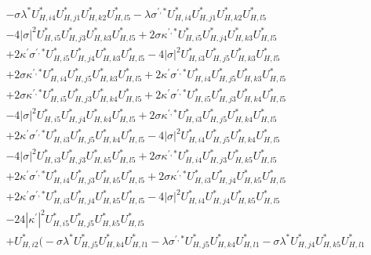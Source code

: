 \begin{align}
 &- \sigma \lambda^* U^*_{{H},{i 4}} U^*_{{H},{j 1}} U^*_{{H},{k 2}} U^*_{{H},{l 5}} - \lambda \sigma^{\prime,*} U^*_{{H},{i 4}} U^*_{{H},{j 1}} U^*_{{H},{k 2}} U^*_{{H},{l 5}} \nonumber \\ 
 &-4 |\sigma|^2 U^*_{{H},{i 5}} U^*_{{H},{j 3}} U^*_{{H},{k 3}} U^*_{{H},{l 5}} +2 \sigma \kappa^{\prime,*} U^*_{{H},{i 5}} U^*_{{H},{j 4}} U^*_{{H},{k 3}} U^*_{{H},{l 5}} \nonumber \\ 
 &+2 \kappa^\prime \sigma^{\prime,*} U^*_{{H},{i 5}} U^*_{{H},{j 4}} U^*_{{H},{k 3}} U^*_{{H},{l 5}} -4 |\sigma|^2 U^*_{{H},{i 3}} U^*_{{H},{j 5}} U^*_{{H},{k 3}} U^*_{{H},{l 5}} \nonumber \\ 
 &+2 \sigma \kappa^{\prime,*} U^*_{{H},{i 4}} U^*_{{H},{j 5}} U^*_{{H},{k 3}} U^*_{{H},{l 5}} +2 \kappa^\prime \sigma^{\prime,*} U^*_{{H},{i 4}} U^*_{{H},{j 5}} U^*_{{H},{k 3}} U^*_{{H},{l 5}} \nonumber \\ 
 &+2 \sigma \kappa^{\prime,*} U^*_{{H},{i 5}} U^*_{{H},{j 3}} U^*_{{H},{k 4}} U^*_{{H},{l 5}} +2 \kappa^\prime \sigma^{\prime,*} U^*_{{H},{i 5}} U^*_{{H},{j 3}} U^*_{{H},{k 4}} U^*_{{H},{l 5}} \nonumber \\ 
 &-4 |\sigma|^2 U^*_{{H},{i 5}} U^*_{{H},{j 4}} U^*_{{H},{k 4}} U^*_{{H},{l 5}} +2 \sigma \kappa^{\prime,*} U^*_{{H},{i 3}} U^*_{{H},{j 5}} U^*_{{H},{k 4}} U^*_{{H},{l 5}} \nonumber \\ 
 &+2 \kappa^\prime \sigma^{\prime,*} U^*_{{H},{i 3}} U^*_{{H},{j 5}} U^*_{{H},{k 4}} U^*_{{H},{l 5}} -4 |\sigma|^2 U^*_{{H},{i 4}} U^*_{{H},{j 5}} U^*_{{H},{k 4}} U^*_{{H},{l 5}} \nonumber \\ 
 &-4 |\sigma|^2 U^*_{{H},{i 3}} U^*_{{H},{j 3}} U^*_{{H},{k 5}} U^*_{{H},{l 5}} +2 \sigma \kappa^{\prime,*} U^*_{{H},{i 4}} U^*_{{H},{j 3}} U^*_{{H},{k 5}} U^*_{{H},{l 5}} \nonumber \\ 
 &+2 \kappa^\prime \sigma^{\prime,*} U^*_{{H},{i 4}} U^*_{{H},{j 3}} U^*_{{H},{k 5}} U^*_{{H},{l 5}} +2 \sigma \kappa^{\prime,*} U^*_{{H},{i 3}} U^*_{{H},{j 4}} U^*_{{H},{k 5}} U^*_{{H},{l 5}} \nonumber \\ 
 &+2 \kappa^\prime \sigma^{\prime,*} U^*_{{H},{i 3}} U^*_{{H},{j 4}} U^*_{{H},{k 5}} U^*_{{H},{l 5}} -4 |\sigma|^2 U^*_{{H},{i 4}} U^*_{{H},{j 4}} U^*_{{H},{k 5}} U^*_{{H},{l 5}} \nonumber \\ 
 &-24 |\kappa^\prime|^2 U^*_{{H},{i 5}} U^*_{{H},{j 5}} U^*_{{H},{k 5}} U^*_{{H},{l 5}} \nonumber \\ 
 &+U^*_{{H},{i 2}} \Big(- \sigma \lambda^* U^*_{{H},{j 5}} U^*_{{H},{k 4}} U^*_{{H},{l 1}} - \lambda \sigma^{\prime,*} U^*_{{H},{j 5}} U^*_{{H},{k 4}} U^*_{{H},{l 1}} - \sigma \lambda^* U^*_{{H},{j 4}} U^*_{{H},{k 5}} U^*_{{H},{l 1}} \nonumber \\ 

\end{align}
